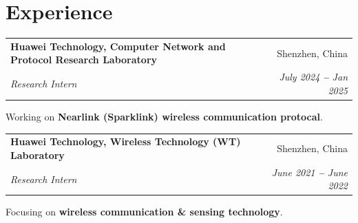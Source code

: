 \documentclass[letterpaper,10pt]{article}
\makeatletter
\newcommand{\resumeSubheading}[4]{
  \vspace{-2pt}\item
    \begin{tabular*}{0.97\textwidth}[t]{l@{\extracolsep{\fill}}r}
      \textbf{#1} & #2 \\
      \textit{\small#3} & \textit{\small #4} \\
    \end{tabular*}\vspace{-7pt}
}
\newcommand{\resumeSubHeadingListStart}{\begin{itemize}[leftmargin=0.15in, label={}]}
\newcommand{\resumeSubHeadingListEnd}{\end{itemize}\vspace{-5pt}}
\makeatother
\begin{document}
\section{Experience}
  \vspace{3pt}
  \resumeSubHeadingListStart
    \resumeSubheading
      {Huawei Technology, Computer Network and Protocol Research Laboratory}{Shenzhen, China}
      {Research Intern}{July 2024 \textbf{--} Jan 2025}
      \resumeSubHeadingListStart
      \small{\item{Working on \textbf{Nearlink (Sparklink) wireless communication protocal}. 
      }
      }
      \resumeSubHeadingListEnd  
    \resumeSubheading
      {Huawei Technology, Wireless Technology (WT) Laboratory}{Shenzhen, China}
      {Research Intern}{June 2021 \textbf{--} June 2022}
      \resumeSubHeadingListStart
      \small{\item{Focusing on \textbf{wireless communication \& sensing technology}. 
      }
      }
      \resumeSubHeadingListEnd  
  \resumeSubHeadingListEnd

\end{document}
